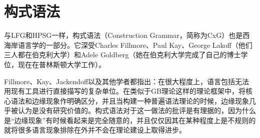 
\chapter{构式语法}
\label{Kapitel-CxG}

%
%
%
%

与LFG和HPSG一样，构式语法（Construction Grammar，简称为CxG）也是西海岸语言学的一部分。它深受Charles Fillmore、Paul Kay、George Lakoff（他们三人都在伯克利大学）和Adele Goldberg（她在伯克利大学完成了自己的博士学位，现在在普林斯顿大学工作）\citep*{Fillmore88a,FKoC88a,KF99a,Kay2002a,Kay2005a,Goldberg95a,Goldberg2006a}。

Fillmore、Kay、Jackendoff以及其他学者都指出：在很大程度上，语言包括无法用现有工具进行直接描写的复杂单位。在类似于GB理论这样的理论框架中，将核心语法和边缘现象作明确区分\citep[]{Chomsky81a}，并且当构建一种普遍语法理论的时候，边缘现象几乎被认为是没有研究价值的。构式语法对于这一做法的批评是有理据的，因为什么是“边缘现象”有时候看起来是完全随意的\citep{MuellerKernigkeit}，并且仅仅因其在某种程度上是不规则的就将很多语言现象排除在外并不会在理论建设上取得进步。

